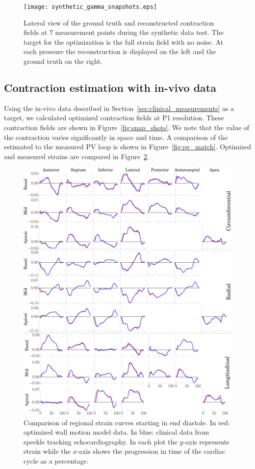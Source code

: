 \begin{figure}[htbp]
 \texttt{[image: synthetic\_gamma\_snapshots.eps]}
 \caption{Lateral view of the ground truth and reconstructed contraction fields at 7 measurement points during
  the synthetic data test. The target for the optimization is the full strain field with no noise.
 At each pressure the reconstruction is displayed on the left and the ground truth on the right.}
\label{fig:synthetic_gammafields}
 \end{figure}

\subsection{Contraction estimation with in-vivo data}
\label{sec:results_clinical}

Using the in-vivo data described in
Section~\ref{sec:clinical_measurements} as a target, we calculated optimized contraction 
fields at P1 resolution. These contraction fields are shown in
Figure~\ref{fig:snap_shots}. We note that the value of the contraction varies significantly in space and time.
A comparison of the estimated to the measured PV loop is shown in Figure~\ref{fig:pv_match}. Optimized
and measured strains are compared in Figure~\ref{fig:strain_match}.

\begin{figure}[htbp]
\centering
  \includegraphics[width=\textwidth]{simulated_strains}
\caption{Comparison of regional strain curves starting in end diastole. In red: optimized wall
  motion model data. In blue: clinical data from speckle tracking
  echocardiography. In each plot the $y$-axis represents strain while
  the $x$-axis shows the progression in time of the cardiac cycle as a
  percentage.}
  \label{fig:strain_match}
\end{figure}

